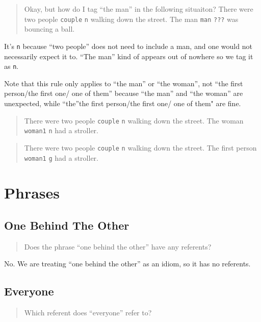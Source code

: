 \documentclass[
]{book}
\begin{document}
\begin{quote}
Okay, but how do I tag ``the man'' in the following situaiton?
There were two people \texttt{couple} \texttt{n} walking down the street.
The man \texttt{man} \texttt{???} was bouncing a ball.
\end{quote}

It's \texttt{n} because
``two people'' does not need to include a man, and one would not necessarily
expect it to.
``The man'' kind of appears out of nowhere so we tag it as \texttt{n}.

Note that this rule only applies to ``the man'' or ``the woman'', not ``the first person/the first one/ one of them''
because ``the man'' and ``the woman'' are unexpected, while ``the''the first person/the first one/ one of them" are fine.

\begin{quote}
There were two people \texttt{couple} \texttt{n} walking down the street.
The woman \texttt{woman1} \texttt{n} had a stroller.
\end{quote}

\begin{quote}
There were two people \texttt{couple} \texttt{n} walking down the street.
The first person \texttt{woman1} \texttt{g} had a stroller.
\end{quote}

\hypertarget{phrases}{%
\section{Phrases}\label{phrases}}

\hypertarget{one-behind-the-other}{%
\subsection{One Behind The Other}\label{one-behind-the-other}}

\begin{quote}
Does the phrase ``one behind the other'' have any referents?
\end{quote}

No.
We are treating ``one behind the other'' as an idiom, so it has no referents.

\hypertarget{everyone}{%
\subsection{Everyone}\label{everyone}}

\begin{quote}
Which referent does ``everyone'' refer to?
\end{quote}
\end{document}
